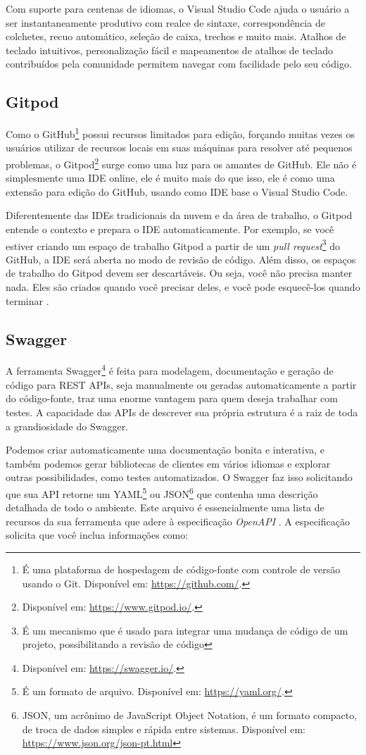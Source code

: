 Com suporte para centenas de idiomas, o Visual Studio Code ajuda o usuário a ser instantaneamente produtivo com realce de sintaxe, correspondência de colchetes, recuo automático, seleção de caixa, trechos e muito mais. Atalhos de teclado intuitivos, personalização fácil e mapeamentos de atalhos de teclado contribuídos pela comunidade permitem navegar com facilidade pelo seu código. \cite{microsoft2020VSCode}


\subsection{Gitpod}
\label{ssec:Gitpod}
Como o GitHub\footnote{É uma plataforma de hospedagem de código-fonte com controle de versão usando o Git. Disponível em: \url{https://github.com/}.} possui recursos limitados para edição, forçando muitas vezes os usuários utilizar de recursos locais em suas máquinas para resolver até pequenos problemas, o Gitpod\footnote{Disponível em: \url{https://www.gitpod.io/}.} surge como uma luz para os amantes de GitHub. Ele não é simplesmente uma IDE online, ele é muito mais do que isso, ele é como uma extensão para edição do GitHub, usando como IDE base o Visual Studio Code. 

Diferentemente das IDEs tradicionais da nuvem e da área de trabalho, o Gitpod entende o contexto e prepara o IDE automaticamente. Por exemplo, se você estiver criando um espaço de trabalho Gitpod a partir de um \textit{pull request}\footnote{É um mecanismo que é usado para integrar uma mudança de código de um projeto, possibilitando a revisão de código} do GitHub, a IDE será aberta no modo de revisão de código. Além disso, os espaços de trabalho do Gitpod devem ser descartáveis. Ou seja, você não precisa manter nada. Eles são criados quando você precisar deles, e você pode esquecê-los quando terminar \cite{typefox2020Gitpod}. 


\subsection{Swagger}
\label{ssec:Swagger}
A ferramenta Swagger\footnote{Disponível em: \url{https://swagger.io/}.} é feita para modelagem, documentação e geração de código para REST APIs, seja manualmente ou geradas automaticamente a partir do código-fonte, traz uma enorme vantagem para quem deseja trabalhar com testes. A capacidade das APIs de descrever sua própria estrutura é a raiz de toda a grandiosidade do Swagger.

Podemos criar automaticamente uma documentação bonita e interativa, e também podemos gerar bibliotecas de clientes em vários idiomas e explorar outras possibilidades, como testes automatizados. O Swagger faz isso solicitando que sua API retorne um YAML\footnote{É um formato de arquivo. Disponível em: \url{https://yaml.org/}.} ou JSON\footnote{JSON, um acrônimo de JavaScript Object Notation, é um formato compacto, de troca de dados simples e rápida entre sistemas. Disponível em: \url{https://www.json.org/json-pt.html}} que contenha uma descrição detalhada de todo o ambiente. Este arquivo é essencialmente uma lista de recursos da sua ferramenta que adere à especificação \textit{OpenAPI} \cite{smartbear2020Swagger}. A especificação solicita que você inclua informações como:

